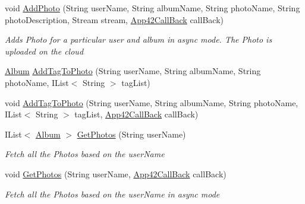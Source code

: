 \begin{DoxyCompactItemize}
void \hyperlink{classcom_1_1shephertz_1_1app42_1_1paas_1_1sdk_1_1csharp_1_1gallery_1_1_photo_service_ab9046d870d1039d0de68739abb46d94b}{Add\+Photo} (String user\+Name, String album\+Name, String photo\+Name, String photo\+Description, Stream stream, \hyperlink{interfacecom_1_1shephertz_1_1app42_1_1paas_1_1sdk_1_1csharp_1_1_app42_call_back}{App42\+Call\+Back} call\+Back)
\begin{DoxyCompactList}\small\item\em Adds Photo for a particular user and album in async mode. The Photo is uploaded on the cloud \end{DoxyCompactList}\item 
\hyperlink{classcom_1_1shephertz_1_1app42_1_1paas_1_1sdk_1_1csharp_1_1gallery_1_1_album}{Album} \hyperlink{classcom_1_1shephertz_1_1app42_1_1paas_1_1sdk_1_1csharp_1_1gallery_1_1_photo_service_a1361b0eaa083f2a8733f5246c9cdffd8}{Add\+Tag\+To\+Photo} (String user\+Name, String album\+Name, String photo\+Name, I\+List$<$ String $>$ tag\+List)
\item 
void \hyperlink{classcom_1_1shephertz_1_1app42_1_1paas_1_1sdk_1_1csharp_1_1gallery_1_1_photo_service_a70b1e1274dba5ce6b2899fde933b9edf}{Add\+Tag\+To\+Photo} (String user\+Name, String album\+Name, String photo\+Name, I\+List$<$ String $>$ tag\+List, \hyperlink{interfacecom_1_1shephertz_1_1app42_1_1paas_1_1sdk_1_1csharp_1_1_app42_call_back}{App42\+Call\+Back} call\+Back)
\item 
I\+List$<$ \hyperlink{classcom_1_1shephertz_1_1app42_1_1paas_1_1sdk_1_1csharp_1_1gallery_1_1_album}{Album} $>$ \hyperlink{classcom_1_1shephertz_1_1app42_1_1paas_1_1sdk_1_1csharp_1_1gallery_1_1_photo_service_a34f84f9576fd8fbd1612dbf387e0951f}{Get\+Photos} (String user\+Name)
\begin{DoxyCompactList}\small\item\em Fetch all the Photos based on the user\+Name \end{DoxyCompactList}\item 
void \hyperlink{classcom_1_1shephertz_1_1app42_1_1paas_1_1sdk_1_1csharp_1_1gallery_1_1_photo_service_ab7868a3426eb7c34d85311afaf88ee75}{Get\+Photos} (String user\+Name, \hyperlink{interfacecom_1_1shephertz_1_1app42_1_1paas_1_1sdk_1_1csharp_1_1_app42_call_back}{App42\+Call\+Back} call\+Back)
\begin{DoxyCompactList}\small\item\em Fetch all the Photos based on the user\+Name in async mode \end{DoxyCompactList}\item 

\end{DoxyCompactItemize}
